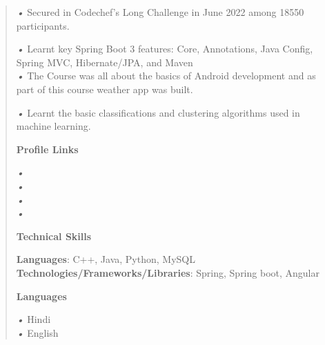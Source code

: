 \documentclass[
]{article}
\begin{document}
\begin{quote}
\emph{•} Secured in Codechef's Long Challenge in June 2022 among 18550
participants.

\emph{•} Learnt key Spring Boot 3 features: Core, Annotations, Java
Config, Spring MVC, Hibernate/JPA, and Maven\\
\emph{•} The Course was all about the basics of Android development and
as part of this course weather app was built.

\emph{•} Learnt the basic classifications and clustering algorithms used
in machine learning.

\textbf{Profile Links}

\emph{•}\\
\emph{•}\\
\emph{•}\\
\emph{•}

\textbf{Technical Skills}

\textbf{Languages}: C++, Java, Python, MySQL\\
\textbf{Technologies/Frameworks/Libraries}: Spring, Spring boot, Angular

\textbf{Languages}

\emph{•} Hindi\\
\emph{•} English
\end{quote}
\end{document}
